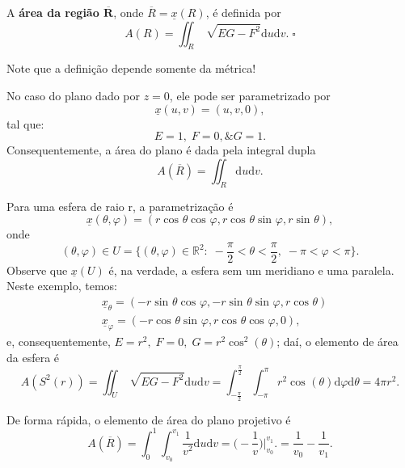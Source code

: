 \documentclass[../differential_geometry.tex]{subfiles}
\begin{document}
\begin{def*}
	A \textbf{área da região \(\mathbf{\overline{R}}\)}, onde \(\overline{R} = \underline{x}(R)\), é definida por
	\[
		A(R) = \iint_{R}\sqrt[]{EG-F^{2}}\mathrm{d}u\mathrm{d}v. \; \square
	\]
\end{def*}
\begin{tcolorbox}[
		skin=enhanced,
		title=Observação,
		fonttitle=\bfseries,
		colframe=black,
		colbacktitle=cyan!75!white,
		colback=cyan!15,
		colbacklower=black,
		coltitle=black,
		drop fuzzy shadow,
	]
	Note que a definição depende somente da métrica!
\end{tcolorbox}
\begin{example}[Plano]
	No caso do plano dado por \(z=0\), ele pode ser parametrizado por
	\[
		\underline{x}(u, v) = (u, v, 0),
	\]
	tal que:
	\[
		E = 1, \; F= 0, \& G = 1.
	\]
	Consequentemente, a área do plano é dada pela integral dupla
	\[
		A(\overline{R}) = \iint_{R}\mathrm{d}u\mathrm{d}v.
	\]
\end{example}
\begin{example}[Esfera]
	Para uma esfera de raio r, a parametrização é
	\[
		\underline{x}(\theta , \varphi ) = (r\cos^{}{\theta }\cos^{}{\varphi }, r \cos^{}{\theta } \sin^{}{\varphi }, r \sin^{}{\theta }),
	\]
	onde
	\[
		(\theta , \varphi )\in U = \biggl\{(\theta , \varphi )\in \mathbb{R}^{2}:\; -\frac{\pi }{2} < \theta <\frac{\pi }{2},\; -\pi <\varphi <\pi \biggr\}.
	\]
	Observe que \(\underline{x}(U)\) é, na verdade, a esfera sem um meridiano e uma paralela. Neste exemplo, temos:
	\begin{align*}
		 & \underline{x}_{\theta } = (-r\sin^{}{\theta }\cos^{}{\varphi }, -r \sin^{}{\theta }\sin^{}{\varphi }, r \cos^{}{\theta }) \\
		 & \underline{x}_{\varphi } = (-r\cos^{}{\theta }\sin^{}{\varphi }, r\cos^{}{\theta }\cos^{}{\varphi }, 0),
	\end{align*}
	e, consequentemente, \(E = r^{2}, \; F = 0,\; G = r^{2}\cos^{2}{(\theta )}\); daí, o elemento de área da esfera é
	\[
		A(S^{2}(r)) = \iint_{U}\sqrt[]{EG-F^{2}}\mathrm{d}u\mathrm{d}v = \int_{-\frac{\pi }{2}}^{\frac{\pi }{2}} \int_{-\pi }^{\pi }r^{2}\cos^{}{(\theta )} \mathrm{d}\varphi  \mathrm{d}\theta  = 4\pi r^{2}.
	\]
\end{example}
\begin{example}
	De forma rápida, o elemento de área do plano projetivo é
	\[
		A(\overline{R}) = \int_{0}^{1}\int_{v_{0}}^{v_1}\frac{1}{v^{2}} \mathrm{d}u \mathrm{d}v = \biggl(-\frac{1}{v}\biggr)\biggl|_{v_{0}}^{v_1}\biggr. = \frac{1}{v_{0}}-\frac{1}{v_1}.
	\]
\end{example}
\end{document}
